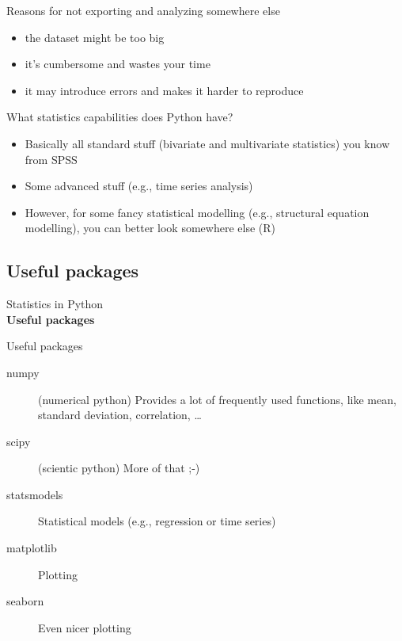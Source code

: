 \documentclass{beamer}
\begin{document}
\begin{frame}{Reasons for not exporting and analyzing somewhere else}
\begin{itemize}
	\item the dataset might be too big
	\item it's cumbersome and wastes your time
	\item it may introduce errors and makes it harder to reproduce
\end{itemize}
\end{frame}


\begin{frame}{What statistics capabilities does Python have?}
	
\begin{itemize}
	\item Basically all standard stuff (bivariate and multivariate statistics) you know from SPSS
	\item Some advanced stuff (e.g., time series analysis)
	\item However, for some fancy statistical modelling (e.g., structural equation modelling), you can better look somewhere else (R)
	
\end{itemize}
\end{frame}





\subsection{Useful packages}

\begin{frame}[plain]
	Statistics in Python\\
	\textbf{Useful packages}
\end{frame}


\begin{frame}{Useful packages}
	\begin{description}
		\item[numpy] (numerical python) Provides a lot of frequently used functions, like mean, standard deviation, correlation, \ldots
		\item[scipy] (scientic python) More of that ;-)
		\item[statsmodels] Statistical models (e.g., regression or time series)
		\item[matplotlib] Plotting
		\item[seaborn] Even nicer plotting
		
	\end{description}
\end{frame}
\end{document}
